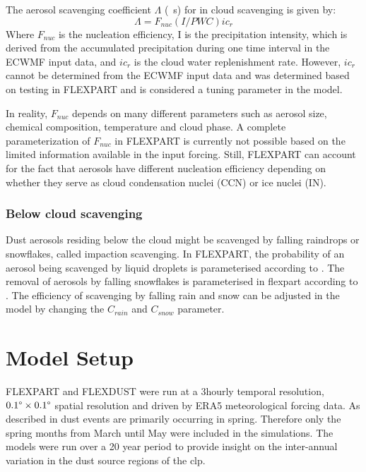 The aerosol scavenging coefficient $\Lambda$ (\si{\per\s}) for in cloud scavenging is given by:
\begin{equation}
    \Lambda = F_{nuc}\left(I/PWC\right)ic_r
\end{equation}
Where $F_{nuc}$ is the nucleation efficiency, I is the precipitation intensity, which is derived from the accumulated precipitation during one time interval in the ECWMF input data, and $ic_r$ is the cloud water replenishment rate. However, $ic_r$ cannot be determined from the ECWMF input data and was determined based on testing in FLEXPART and is considered a tuning parameter in the model.   

In reality, $F_{nuc}$ depends on many different parameters such as aerosol size, chemical composition, temperature and cloud phase. 
A complete parameterization of $F_{nuc}$ in FLEXPART is currently not possible based on the limited information available in the input forcing. 
Still, FLEXPART can account for the fact that aerosols have different nucleation efficiency depending on whether they serve as cloud condensation nuclei (CCN) or ice nuclei (IN). 

\subsubsection{Below cloud scavenging}
Dust aerosols residing below the cloud might be scavenged by falling raindrops or snowflakes, called impaction scavenging. 
In FLEXPART, the probability of an aerosol being scavenged by liquid droplets is parameterised according to \textcite{laakso2003ultrafine}. 
The removal of aerosols by falling snowflakes is parameterised in \acrshort{flexpart} according to \textcite{kyro2009snow}.
The efficiency of scavenging by falling rain and snow can be adjusted in the model by changing the $C_{rain}$ and $C_{snow}$ parameter.   


\section{Model Setup}\label{sec:Model_setup}
FLEXPART and FLEXDUST were run at a 3hourly temporal resolution, $0.1\degree \times 0.1\degree$ spatial resolution and driven by  ERA5 meteorological forcing data. 
As described in  dust events are primarily occurring in spring. Therefore only the spring months from March until May were included in the simulations. The models were run over a 20 year period to provide insight on the inter-annual variation in the dust source regions of the \acrshort{clp}.   

